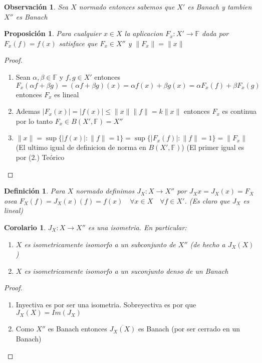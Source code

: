 \documentclass[10pt]{extarticle}
\theoremstyle{break}
\newtheorem{corollary}{Corolario}[theorem]
\newtheorem{proposition}{Proposición}
\newtheorem*{remark}{Observación}
\newtheorem{definition}{Definición}[section]
\theoremstyle{definition}
\begin{document}
\begin{remark}
Sea $X$ normado entonces sabemos que $X'$ es Banach y tambien $X''$ es Banach
\end{remark}

\begin{proposition}
	Para cualquier $x\in X$ la aplicacion $F_{x}:X'\rightarrow\mathbb{F}$ dada por $F_{x}(f)=f(x)$ satisface que $F_{x}\in X''$ y $\lVert F_{x} \rVert=\lVert x \rVert$
\end{proposition}

\begin{proof}
	\begin{enumerate}
		\item Sean $\alpha ,\beta\in \mathbb{F}$ y $f,g\in X'$ entonces $F_{x}(\alpha f+\beta g)=(\alpha f+\beta g)(x)=\alpha f(x)+\beta g(x)=\alpha F_{x}(f)+\beta F_{x}(g)$ entonces $F_{x}$ es lineal
		\item Ademas $\lvert F_{x}(x) \rvert=\lvert f(x) \rvert\leq \lVert x \rVert\lVert f \rVert=k\lVert x \rVert$ entonces $F_{x}$ es continua por lo tanto $F_{x}\in B(X',\mathbb{F})=X''$
		\item $\lVert x \rVert=\sup \{ \lvert f(x) \rvert:\lVert f \rVert=1 \}=\sup \{ \lvert F_{x}(f) \rvert:\lVert f \rVert=1 \}=\lVert F_{x} \rVert$ (El ultimo igual de definicion de norma en $B(X',\mathbb{F})$) (El primer igual es por ($2.$) Teórico
	\end{enumerate}
\end{proof}

\begin{definition}
Para $X$ normado definimos $J_{X}:X\rightarrow X''$ por $J_{X}x=J_{X}(x)=F_{X}$ osea $F_{X}(f)=J_{X}(x)(f)=f(x)\quad\forall x\in X\quad\forall f\in X'$. (Es claro que $J_{X}$ es lineal)
\end{definition}

\begin{corollary}
$J_{X}:X\rightarrow X''$ es una isometria. En particular:
\begin{enumerate}
\item
$X$ es isometricamente isomorfo a un subconjunto de $X''$ (de hecho a $J_{X}(X)$)
\item
$X$ es isometricamente isomorfo a un suconjunto denso de un Banach
\end{enumerate}
\end{corollary}

\begin{proof}
\begin{enumerate}
\item
Inyectiva es por ser una isometria. Sobreyectiva es por que $J_{X}(X)=Im(J_{X})$
\item
Como $X''$ es Banach entonces $\overline{J_{X}(X)}$ es Banach (por ser cerrado en un Banach)
\end{enumerate}
\end{proof}
\end{document}
